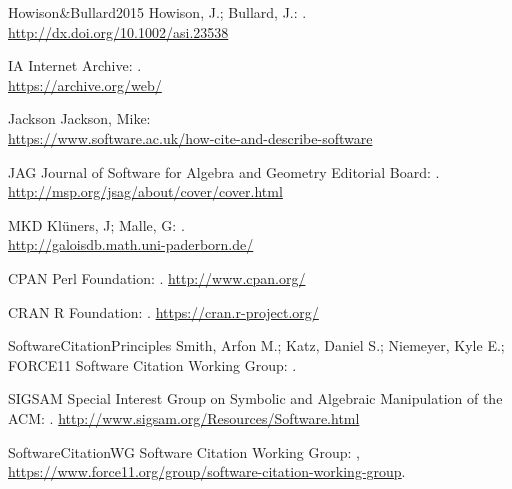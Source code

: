 \documentclass[12pt]{article}
\begin{document}
\begin{thebibliography}{19}
\bibitem
{Howison&Bullard2015}
Howison, J.; Bullard, J.:
.
\\
\url{http://dx.doi.org/10.1002/asi.23538}

\bibitem
{IA}
Internet Archive:
.\\
\newblock \url{https://archive.org/web/}


\bibitem
{Jackson}
Jackson, Mike:
\\
\newblock \url{https://www.software.ac.uk/how-cite-and-describe-software}

\bibitem
{JAG}
Journal of Software for Algebra and Geometry Editorial Board:
.\\
\newblock \url{http://msp.org/jsag/about/cover/cover.html}

\bibitem
{MKD}
Kl\"uners, J; Malle, G:
.\\
\newblock \url{http://galoisdb.math.uni-paderborn.de/}

\bibitem
{CPAN}
Perl Foundation:
.
\newblock \url{http://www.cpan.org/}


\bibitem
{CRAN}
R Foundation:
.
\newblock \url{https://cran.r-project.org/}

\bibitem
{SoftwareCitationPrinciples}
Smith, Arfon M.; Katz, Daniel S.; Niemeyer, Kyle E.; FORCE11 Software Citation Working Group: 
.\\

\bibitem
{SIGSAM}
Special Interest Group on Symbolic and Algebraic Manipulation of the ACM:
.
\newblock \url{http://www.sigsam.org/Resources/Software.html}


\bibitem
{SoftwareCitationWG}
Software Citation Working Group:
,
\newblock \url{https://www.force11.org/group/software-citation-working-group}.


\end{thebibliography}
\end{document}
